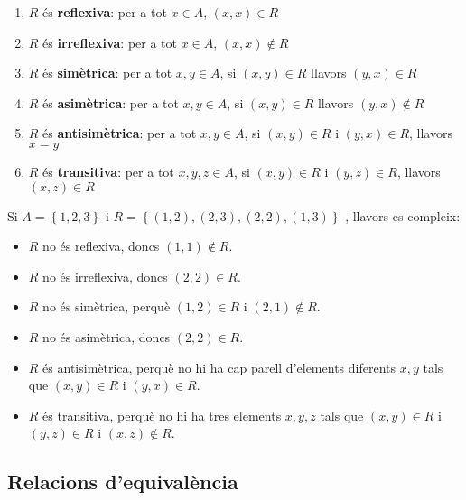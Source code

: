 \begin{enumerate}
\item $R$ \'{e}s \textbf{reflexiva}: per a tot $x\in A$, $(x,x)\in R$

\item $R$ \'{e}s \textbf{irreflexiva}: per a tot $x\in A$, $(x,x)\notin R$

\item $R$ \'{e}s \textbf{sim\`{e}trica}: per a tot $x,y\in A$, si $(x,y)\in R
$ llavors $(y,x)\in R$

\item $R$ \'{e}s \textbf{asim\`{e}trica}: per a tot $x,y\in A$, si $(x,y)\in
R$ llavors $(y,x)\notin R$

\item $R$ \'{e}s \textbf{antisim\`{e}trica}: per a tot $x,y\in A$, si $%
(x,y)\in R $ i $(y,x)\in R$, llavors $x=y$

\item $R$ \'{e}s \textbf{transitiva}: per a tot $x,y,z\in A$, si $(x,y)\in R$
i $(y,z)\in R$, llavors $(x,z)\in R$
\end{enumerate}

\begin{exemple}
Si $A=\left\{ 1,2,3\right\} $ i $R=\left\{ (1,2),(2,3),(2,2),(1,3)\right\} $%
, llavors es compleix:

\begin{itemize}
\item $R$ no \'{e}s reflexiva, doncs $(1,1)\notin R$.

\item $R$ no \'{e}s irreflexiva, doncs $(2,2)\in R$.

\item $R$ no \'{e}s sim\`{e}trica, perqu\`{e} $(1,2)\in R$ i $(2,1)\notin R$.

\item $R$ no \'{e}s asim\`{e}trica, doncs $(2,2)\in R$.

\item $R$ \'{e}s antisim\`{e}trica, perqu\`{e} no hi ha cap parell
d'elements diferents $x,y$ tals que $(x,y)\in R$ i $(y,x)\in R$.

\item $R$ \'{e}s transitiva, perqu\`{e} no hi ha tres elements $x,y,z$ tals
que $(x,y)\in R$ i $(y,z)\in R$ i $(x,z)\notin R$.
\end{itemize}
\end{exemple}

\subsection{Relacions d'equival\`{e}ncia}

